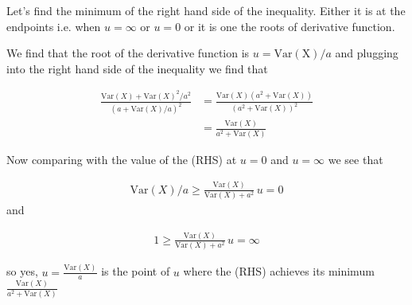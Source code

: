

Let's find the minimum of the right hand side of the inequality. Either it is at the endpoints i.e.
when $ u = \infty$ or $ u = 0$ or it is one the roots of derivative function.

We find that the root of the derivative function is $ u = \mathrm{Var(X)}/a$ and plugging into the right hand side of
the inequality we find that 

\begin{align*}
    \frac{ \mathrm{Var}(X)  + \mathrm{Var}(X)^2/a^2}{(a + \mathrm{Var}(X)/a)^2} &= \frac{ \mathrm{Var}(X)(a^2 +
    \mathrm{Var}(X) )}{(a^2 + \mathrm{Var}(X) )^2} \\
								       &= \frac{ \mathrm{Var}(X) }{a^2
								       + \mathrm{Var}(X) } 
\end{align*}

Now comparing with the value of the (RHS) at $ u = 0$ and $ u = \infty$ we see that 

\begin{align*}
    \mathrm{Var}(X)/a \geq \frac{ \mathrm{Var}(X)}{ \mathrm{Var}(X) + a^2} \, u=0
\end{align*}
and

\begin{align*}
    1 \geq \frac{ \mathrm{Var}(X)}{ \mathrm{Var}(X) + a^2} \, u = \infty 
\end{align*}

so yes, $ u = \frac{ \mathrm{Var}(X)}{a} $ is the point of $ u$ where the (RHS) achieves its minimum
$ \frac{ \mathrm{Var}(X)}{a^2 + \mathrm{Var}(X)} $ 
